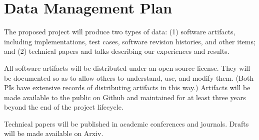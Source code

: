 \section*{Data Management Plan}


The proposed project will produce two types of data: (1) software artifacts,
including implementations, test cases, software revision histories, and
other items; and (2) technical papers and talks describing our experiences
and results.

All software artifacts will be distributed under an open-source
license.  They will be documented so as to allow others to understand,
use, and modify them.  (Both PIs have extensive records of
distributing artifacts in this way.)  Artifacts will be made available
to the public on Github and maintained for at least three years beyond
the end of the project lifecycle.

Technical papers will be published in academic conferences and journals.
Drafts will be made available on Arxiv.

